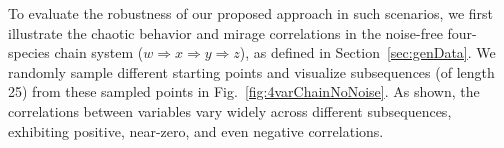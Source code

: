 To evaluate the robustness of our proposed approach in such scenarios, we first illustrate the chaotic behavior and mirage correlations in the noise-free four-species chain system ($w \Rightarrow x \Rightarrow y \Rightarrow z$), as defined in Section~\ref{sec:genData}. We randomly sample different starting points and visualize subsequences (of length 25) from these sampled points in Fig.~\ref{fig:4varChainNoNoise}. As shown, the correlations between variables vary widely across different subsequences, exhibiting positive, near-zero, and even negative correlations.

\begin{table}[htb]
\centering

\end{table}
